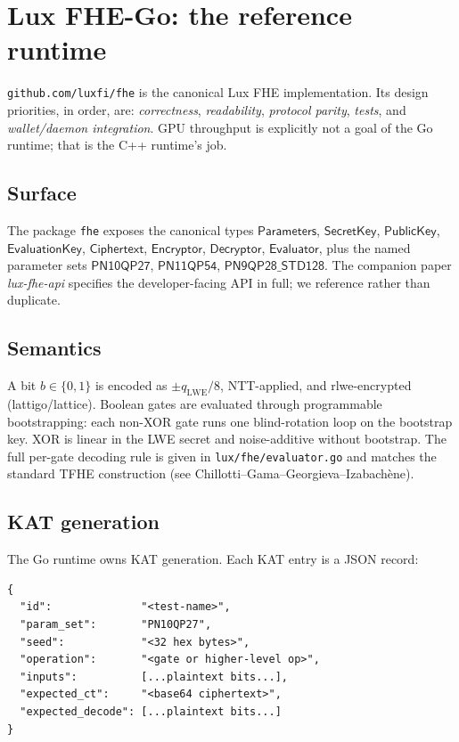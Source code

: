 \section{Lux FHE-Go: the reference runtime}
\label{sec:fhe-go-reference-runtime}

\texttt{github.com/luxfi/fhe} is the canonical Lux FHE implementation.
Its design priorities, in order, are: \emph{correctness}, \emph{readability},
\emph{protocol parity}, \emph{tests}, and \emph{wallet/daemon integration}.
GPU throughput is explicitly not a goal of the Go runtime; that is the
C++ runtime's job.

\subsection{Surface}

The package \texttt{fhe} exposes the canonical types
$\mathsf{Parameters}$, $\mathsf{SecretKey}$, $\mathsf{PublicKey}$,
$\mathsf{EvaluationKey}$, $\mathsf{Ciphertext}$, $\mathsf{Encryptor}$,
$\mathsf{Decryptor}$, $\mathsf{Evaluator}$, plus the named parameter sets
$\mathsf{PN10QP27}$, $\mathsf{PN11QP54}$, $\mathsf{PN9QP28\_STD128}$.
The companion paper \emph{lux-fhe-api} specifies the developer-facing
API in full; we reference rather than duplicate.

\subsection{Semantics}

A bit $b \in \{0, 1\}$ is encoded as $\pm q_{\mathrm{LWE}}/8$, NTT-applied,
and rlwe-encrypted (lattigo/lattice). Boolean gates are evaluated through
programmable bootstrapping: each non-XOR gate runs one blind-rotation
loop on the bootstrap key. XOR is linear in the LWE secret and noise-additive
without bootstrap. The full per-gate decoding rule is given in
\texttt{lux/fhe/evaluator.go} and matches the standard TFHE
construction (see Chillotti--Gama--Georgieva--Izabach\`ene).

\subsection{KAT generation}

The Go runtime owns KAT generation. Each KAT entry is a JSON record:

\begin{lstlisting}
{
  "id":              "<test-name>",
  "param_set":       "PN10QP27",
  "seed":            "<32 hex bytes>",
  "operation":       "<gate or higher-level op>",
  "inputs":          [...plaintext bits...],
  "expected_ct":     "<base64 ciphertext>",
  "expected_decode": [...plaintext bits...]
}
\end{lstlisting}

